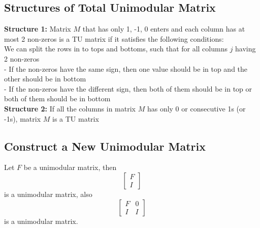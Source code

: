 			\subsection{Structures of Total Unimodular Matrix}
				\textbf{Structure 1:}
					Matrix $M$ that has only 1, -1, 0 enters and each column has at most 2 non-zeros is a TU matrix if it satisfies the following conditions:\\
					We can split the rows in to tops and bottoms, such that for all columns $j$ having 2 non-zeros\\
					- If the non-zeros have the same sign, then one value should be in top and the other should be in bottom\\
					- If the non-zeros have the different sign, then both of them should be in top or both of them should be in bottom\\
				\textbf{Structure 2:}
					If all the columns in matrix $M$ has only 0 or consecutive 1s (or -1s), matrix $M$ is a TU matrix

			\subsection{Construct a New Unimodular Matrix}
				Let $F$ be a unimodular matrix, then
				\begin{equation}
					\left[\begin{matrix}F \\ I\end{matrix}\right] 
				\end{equation}
				is a unimodular matrix, also
				\begin{equation}
					\left[\begin{matrix}F & 0 \\ I & I\end{matrix}\right] 
				\end{equation}
				is a unimodular matrix.